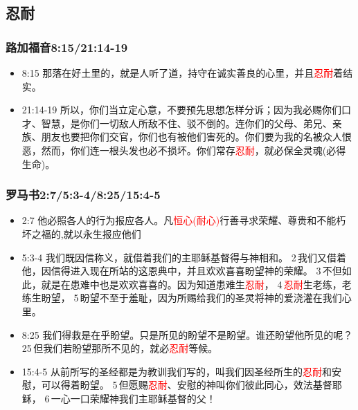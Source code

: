 
\subsection{忍耐}
\subsubsection{路加福音8:15/21:14-19}
\begin{itemize}[noitemsep]
\item 8:15 那落在好土里的，就是人听了道，持守在诚实善良的心里，并且\textcolor{red}{忍耐}着结实。
\item 21:14-19 所以，你们当立定心意，不要预先思想怎样分诉；因为我必赐你们口才、智慧，是你们一切敌人所敌不住、驳不倒的。连你们的父母、弟兄、亲族、朋友也要把你们交官，你们也有被他们害死的。你们要为我的名被众人恨恶，然而，你们连一根头发也必不损坏。你们常存\textcolor{red}{忍耐}，就必保全灵魂(必得生命)。
\end{itemize}
\subsubsection{罗马书2:7/5:3-4/8:25/15:4-5} 
\begin{itemize}[noitemsep]
\item 2:7 他必照各人的行为报应各人。凡\textcolor{red}{恒心(耐心)}行善寻求荣耀、尊贵和不能朽坏之福的,就以永生报应他们
\item 5:3-4 我们既因信称义，就借着我们的主耶稣基督得与神相和。 2 我们又借着他，因信得进入现在所站的这恩典中，并且欢欢喜喜盼望神的荣耀。 3 不但如此，就是在患难中也是欢欢喜喜的。因为知道患难生\textcolor{red}{忍耐}， 4 \textcolor{red}{忍耐}生老练，老练生盼望， 5 盼望不至于羞耻，因为所赐给我们的圣灵将神的爱浇灌在我们心里。
\item 8:25 我们得救是在乎盼望。只是所见的盼望不是盼望。谁还盼望他所见的呢？25 但我们若盼望那所不见的，就必\textcolor{red}{忍耐}等候。
\item 15:4-5 从前所写的圣经都是为教训我们写的，叫我们因圣经所生的\textcolor{red}{忍耐}和安慰，可以得着盼望。 5 但愿赐\textcolor{red}{忍耐}、安慰的神叫你们彼此同心，效法基督耶稣， 6 一心一口荣耀神我们主耶稣基督的父！
\end{itemize}

